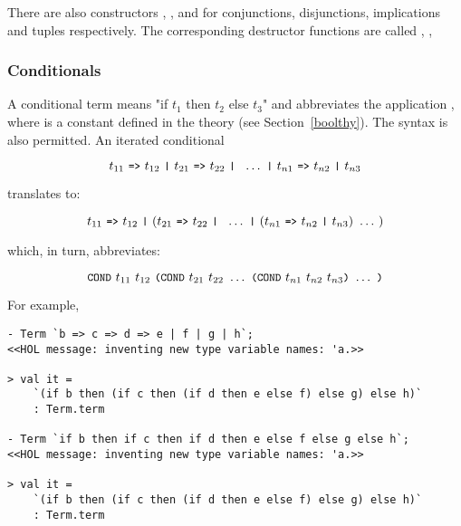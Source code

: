 \noindent There are also constructors
,
,
 and
for conjunctions, disjunctions, implications and tuples respectively.
The corresponding destructor functions are called , \etc,


\subsubsection{Conditionals}\label{conditionals}

A conditional
 term  means
"if $t_1$ then $t_2$ else
$t_3$" and abbreviates the application
, where 
is a constant defined in the theory  (see Section~\ref{boolthy}).
The syntax  is also permitted. An
iterated conditional

\[
t_{11}\ \ml{=>}\ t_{12}\ \ml{|}\
t_{21}\ \ml{=>}\ t_{22}\ \ml{|}\
\ \ldots\ \ml{|}\
t_{n1}\ \ml{=>}\ t_{n2}\ \ml{|}\ t_{n3}
\]

\noindent translates to:

\[
t_{11}\ \ml{=>}\ t_{12}\ \ml{|}\
(t_{21}\ \ml{=>}\ t_{22}\ \ml{|}\
\ \ldots\ \ml{|}\
(t_{n1}\ \ml{=>}\ t_{n2}\ \ml{|}\ t_{n3})\ \ldots\ )
\]

\noindent which, in turn, abbreviates:

\[\ml{COND}\ t_{11}\ t_{12}\ \ml{(COND}\ t_{21}\ t_{22}\ \ldots\
\ml{(COND}\ t_{n1}\ t_{n2}\ t_{n3}\ml{)}\ \ldots\ \ml{)}\]

For example,

\begin{session}\begin{verbatim}
- Term `b => c => d => e | f | g | h`;
<<HOL message: inventing new type variable names: 'a.>>

> val it =
    `(if b then (if c then (if d then e else f) else g) else h)`
    : Term.term

- Term `if b then if c then if d then e else f else g else h`;
<<HOL message: inventing new type variable names: 'a.>>

> val it =
    `(if b then (if c then (if d then e else f) else g) else h)`
    : Term.term
\end{verbatim}\end{session}


